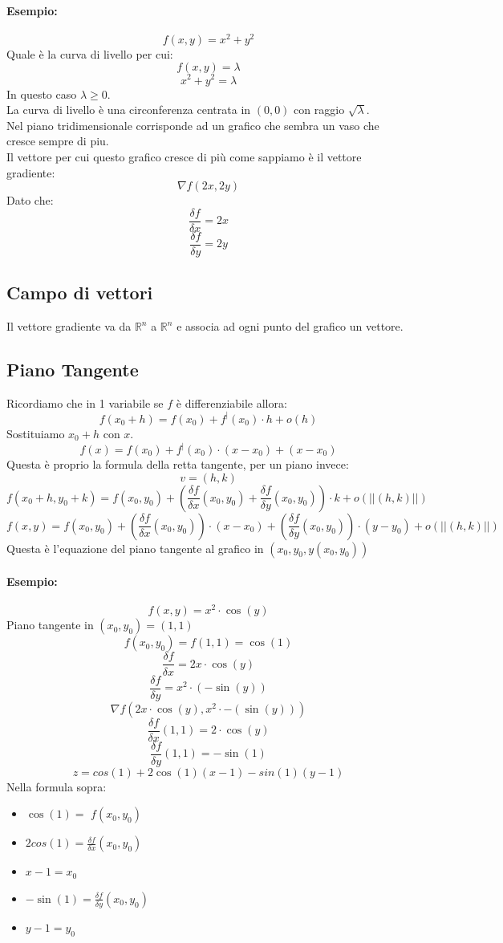 \documentclass[12pt,a4paper]{article}
\begin{document}
\paragraph{Esempio:}
\[
f(x,y) = x^2 + y^2
\]
Quale è la curva di livello per cui:
\[
f(x,y) = \lambda
\]
\[
x^2 + y^2 = \lambda
\]
In questo caso $\lambda \geq 0$.\\
La curva di livello è una circonferenza centrata in $(0,0)$ con raggio $\sqrt{\lambda}$.\\
Nel piano tridimensionale corrisponde ad un grafico che sembra un vaso che cresce sempre di piu.\\
Il vettore per cui questo grafico cresce di più come sappiamo è il vettore gradiente:
\[
\nabla f(2x,2y)
\]
Dato che:
\[
\frac{\delta f}{\delta x} = 2x
\]
\[
\frac{\delta f}{\delta y} = 2y
\]
\subsection{Campo di vettori}
Il vettore gradiente va da $\mathbb{R}^n$ a $\mathbb{R}^n$ e associa ad ogni punto del grafico un vettore.
\subsection{Piano Tangente}
Ricordiamo che in 1 variabile se $f$ è differenziabile allora:
\[
f(x_0 + h) = f(x_0) + f^|(x_0) \cdot h + o(h)
\]
Sostituiamo $x_0 + h$ con $x$.
\[
f(x) = f(x_0) + f^|(x_0) \cdot(x-x_0) + (x-x_0)
\]
Questa è proprio la formula della retta tangente, per un piano invece:
\[
v = (h,k)
\]
\[
f(x_0 + h, y_0 + k) = f(x_0,y_0) + (\frac{\delta f}{\delta x}(x_0,y_0) + \frac{\delta f}{\delta y}(x_0,y_0)) \cdot k + o(||(h,k)||)
\]
\[
f(x, y) = f(x_0,y_0) + (\frac{\delta f}{\delta x}(x_0,y_0))\cdot (x-x_0) + (\frac{\delta f}{\delta y}(x_0,y_0)) \cdot (y-y_0) + o(||(h,k)||)
\]
Questa è l'equazione del piano tangente al grafico in $(x_0,y_0,y(x_0,y_0))$
\paragraph{Esempio:}
\[
f(x,y) = x^2 \cdot \cos(y)
\]
Piano tangente in $(x_0,y_0) = (1,1)$
\[
f(x_0,y_0) = f(1,1) = \cos(1)
\]
\[
\frac{\delta f}{\delta x} = 2x \cdot \cos(y)
\]
\[
\frac{\delta f}{\delta y} = x^2 \cdot (- \sin(y))
\]
\[
\nabla f (2x \cdot \cos(y), x^2 \cdot -(\sin(y)))
\]
\[
\frac{\delta f}{\delta x}(1,1) = 2 \cdot \cos(y)
\]
\[
\frac{\delta f}{\delta y}(1,1) = -\sin(1)
\]
\[
z = cos(1) + 2\cos(1)(x-1) - sin(1)(y-1)
\]
Nella formula sopra:
\begin{itemize}
  \item $\cos(1) =$ $f(x_0,y_0)$
  \item $2cos(1) = \frac{\delta f}{\delta x}(x_0,y_0)$
  \item $x-1 = x_0$
  \item $-\sin(1) = \frac{\delta f}{\delta y}(x_0,y_0)$
  \item $y-1 = y_0$
\end{itemize}
\end{document}

